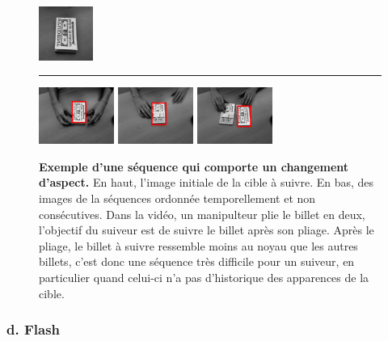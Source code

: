 \documentclass[10pt,twocolumn,letterpaper,french]{article}
\begin{document}
\begin{figure}[!h]
  \centering
  \includegraphics[width=50pt]{images/vids/coupon/kernel/000001.png}
  \vspace{5pt}\par
  \hrule
  \vspace{5pt}\par
  \includegraphics[width=70pt]{images/vids/coupon/000039.png}
  \includegraphics[width=70pt]{images/vids/coupon/000070.png}
  \includegraphics[width=70pt]{images/vids/coupon/000159.png} 
  \caption{\textbf{Exemple d'une séquence qui comporte un changement d'aspect.} En haut, l'image initiale de la cible à suivre. En bas, des images de la séquences ordonnée temporellement et non consécutives. Dans la vidéo, un manipulteur plie le billet en deux, l'objectif du suiveur est de suivre le billet après son pliage. Après le pliage, le billet à suivre ressemble moins au noyau que les autres billets, c'est donc une séquence très difficile pour un suiveur, en particulier quand celui-ci n'a pas d'historique des apparences de la cible.}
  \label{coupons}
  \end{figure}

\subsubsection*{d. Flash}
\label{falsh}
\end{document}
